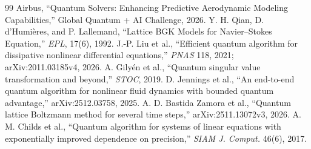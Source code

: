 \documentclass[10pt,twocolumn]{article}
\begin{document}
\newpage
{\fontsize{8}{8.5}\selectfont
\begin{thebibliography}{99}
\setlength{\itemsep}{0pt}
\setlength{\parskip}{0pt}
 Airbus, ``Quantum Solvers: Enhancing Predictive
Aerodynamic Modeling Capabilities,'' Global Quantum + AI Challenge, 2026.
 Y. H. Qian, D. d'Humi\`eres, and P. Lallemand,
``Lattice BGK Models for Navier--Stokes Equation,'' \emph{EPL}, 17(6), 1992.
 J.-P. Liu et al., ``Efficient quantum algorithm for
dissipative nonlinear differential equations,'' \emph{PNAS} 118, 2021;
arXiv:2011.03185v4, 2026.
 A. Gily\'en et al., ``Quantum singular value
transformation and beyond,'' \emph{STOC}, 2019.
 D. Jennings et al., ``An end-to-end quantum algorithm
for nonlinear fluid dynamics with bounded quantum advantage,''
arXiv:2512.03758, 2025.
 A. D. Bastida Zamora et al., ``Quantum lattice Boltzmann
method for several time steps,'' arXiv:2511.13072v3, 2026.
 A. M. Childs et al., ``Quantum algorithm for systems of
linear equations with exponentially improved dependence on precision,''
\emph{SIAM J. Comput.} 46(6), 2017.
\end{thebibliography}
}
\end{document}
